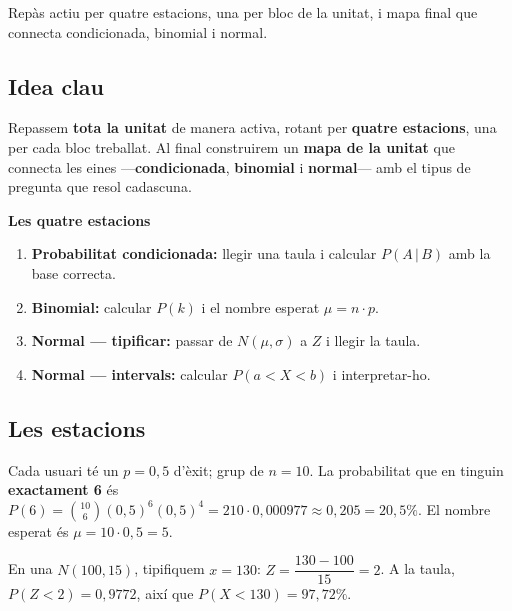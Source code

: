 %
{Repàs actiu per quatre estacions, una per bloc de la unitat, i mapa final que connecta condicionada, binomial i normal.}

\subsection{Idea clau}

Repassem \textbf{tota la unitat} de manera activa, rotant per \textbf{quatre estacions},
una per cada bloc treballat. Al final construirem un \textbf{mapa de la unitat} que
connecta les eines —\textbf{condicionada}, \textbf{binomial} i \textbf{normal}— amb el
tipus de pregunta que resol cadascuna.

\begin{idea}
\textbf{Les quatre estacions}
\begin{enumerate}[leftmargin=1.6em, itemsep=2pt]
  \item \textbf{Probabilitat condicionada:} llegir una taula i calcular $P(A\,|\,B)$ amb
        la base correcta.
  \item \textbf{Binomial:} calcular $P(k)$ i el nombre esperat $\mu=n\cdot p$.
  \item \textbf{Normal — tipificar:} passar de $N(\mu,\sigma)$ a $Z$ i llegir la taula.
  \item \textbf{Normal — intervals:} calcular $P(a<X<b)$ i interpretar-ho.
\end{enumerate}
\end{idea}

\subsection{Les estacions}

\begin{exemple}
Cada usuari té un $p=0,5$ d'èxit; grup de $n=10$. La probabilitat que en tinguin
\textbf{exactament 6} és $P(6)=\binom{10}{6}(0,5)^6(0,5)^4=210\cdot 0,000977\approx
0,205=20,5\%$. El nombre esperat és $\mu=10\cdot 0,5=5$.
\end{exemple}

\begin{exemple}
En una $N(100,15)$, tipifiquem $x=130$: $Z=\dfrac{130-100}{15}=2$. A la taula,
$P(Z<2)=0,9772$, així que $P(X<130)=97,72\%$.
\end{exemple}

